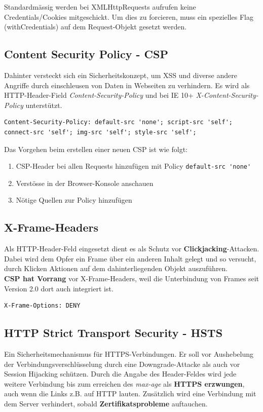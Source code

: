 Standardmässig werden bei XMLHttpRequests aufrufen keine Credentials/Cookies mitgeschickt. Um dies zu forcieren, muss ein spezielles Flag (withCredentials) auf dem Request-Objekt gesetzt werden.

\subsection{Content Security Policy - CSP}
Dahinter versteckt sich ein Sicherheitskonzept, um XSS und diverse andere Angriffe durch einschleusen von Daten in Webseiten zu verhindern. Es wird als HTTP-Header-Field \textit{Content-Security-Policy} und bei IE 10+ \textit{X-Content-Security-Policy} unterstützt.

\begin{lstlisting}[caption=Starter Policy für CSP-Header, language=clean]
Content-Security-Policy: default-src 'none'; script-src 'self'; connect-src 'self'; img-src 'self'; style-src 'self';
\end{lstlisting}

Das Vorgehen beim erstellen einer neuen CSP ist wie folgt:
\begin{enumerate}
	\item CSP-Header bei allen Requests hinzufügen mit Policy \lstinline[language=clean]|default-src 'none'|
	\item Verstösse in der Browser-Konsole anschauen
	\item Nötige Quellen zur Policy hinzufügen
\end{enumerate}

\subsection{X-Frame-Headers}
Als HTTP-Header-Feld eingesetzt dient es als Schutz vor \textbf{Clickjacking}-Attacken. Dabei wird dem Opfer ein Frame über ein anderen Inhalt gelegt und so versucht, durch Klicken Aktionen auf dem dahinterliegenden Objekt auszuführen.\\
\textbf{CSP hat Vorrang} vor X-Frame-Headers, weil die Unterbindung von Frames seit Version 2.0 dort auch integriert ist.

\begin{lstlisting}[caption=Clickjacking mittels X-Frame-Options unterbinden, language=clean]
X-Frame-Options: DENY
\end{lstlisting}

\subsection{HTTP Strict Transport Security - HSTS}
Ein Sicherheitsmechanismus für HTTPS-Verbindungen. Er soll vor Aushebelung der Verbindungsverschlüsselung durch eine Downgrade-Attacke als auch vor Session Hijacking schützen. Durch die Angabe des Header-Feldes wird jede weitere Verbindung bis zum erreichen des \textit{max-age} als \textbf{HTTPS erzwungen}, auch wenn die Links z.B. auf HTTP lauten. Zusätzlich wird eine Verbindung mit dem Server verhindert, sobald \textbf{Zertifikatsprobleme} auftauchen.\\

